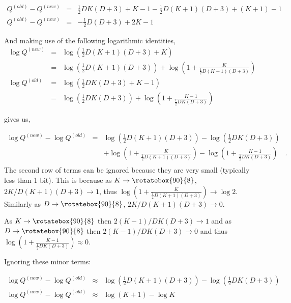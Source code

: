 \documentclass{elsarticle}
\def\infinity{\rotatebox{90}{8}}
\begin{document}
\begin{eqnarray}
Q^{(old)} - Q^{(new)} &=& \frac{1}{2}DK(D + 3) + K - 1 - \frac{1}{2}D(K + 1)(D + 3) + (K + 1) - 1 \nonumber \\
Q^{(old)} - Q^{(new)} &=& -\frac{1}{2}D(D+3) + 2K  - 1
\label{eq:14}
\end{eqnarray}

\noindent{}And making use of the following logarithmic identities,
\begin{eqnarray}
  \log{Q^{(new)}} &=& \log{\left(\frac{1}{2}D(K+1)(D + 3) + K\right)} \nonumber \\
                  &=& \log{\left(\frac{1}{2}D(K+1)(D + 3)\right)} + \log{\left(1 + \frac{K}{\frac{1}{2}D(K+1)(D + 3)}\right)} \\
  \log{Q^{(old)}} &=& \log{\left(\frac{1}{2}DK(D + 3) + K - 1\right)} \nonumber \\
                  &=& \log{\left(\frac{1}{2}DK(D + 3)\right)} + \log{\left(1 + \frac{K - 1}{\frac{1}{2}DK(D + 3)}\right)}
\end{eqnarray}


\noindent{}gives us,

\begin{eqnarray}
  \log{Q^{(new)}} - \log{Q^{(old)}} &=& \log{\left(\frac{1}{2}D(K+1)(D + 3)\right)} - \log{\left(\frac{1}{2}DK(D + 3)\right)} \nonumber \\
                                    &&+ \log{\left(1 + \frac{K}{\frac{1}{2}D(K+1)(D + 3)}\right)} - \log{\left(1 + \frac{K - 1}{\frac{1}{2}DK(D + 3)}\right)} \quad .\\
\end{eqnarray}
The second row of terms can be ignored because they are very small (typically less than 1 bit). This is because as $K \rightarrow \infinity$, $2K/D(K+1)(D+3) \rightarrow 1$, thus $\log{\left(1 + \frac{K}{\frac{1}{2}D(K+1)(D + 3)}\right)} \rightarrow \log{2}$. Similarly as $D \rightarrow \infinity$, $2K/D(K+1)(D+3) \rightarrow 0$.

As $K \rightarrow \infinity$ then $2(K-1)/DK(D+3) \rightarrow 1$ and as $D \rightarrow \infinity$ then $2(K-1)/DK(D+3) \rightarrow 0$ and thus $\log{\left(1 + \frac{K - 1}{\frac{1}{2}DK(D + 3)}\right)} \approx 0$.

\noindent{}Ignoring these minor terms:

\begin{eqnarray}
  \log{Q^{(new)}} - \log{Q^{(old)}} &\approx& \log{\left(\frac{1}{2}D(K+1)(D + 3)\right)} - \log{\left(\frac{1}{2}DK(D + 3)\right)} \nonumber \\
  \log{Q^{(new)}} - \log{Q^{(old)}} &\approx& \log{(K + 1)} - \log{K}
  \label{eq:19}
\end{eqnarray}
\end{document}
